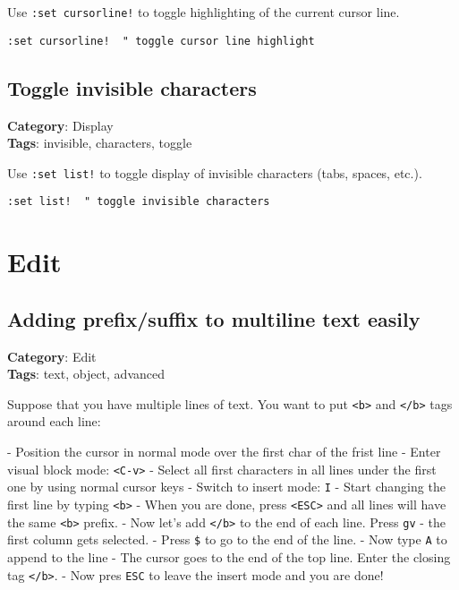{{{{Use {\footnotesize \Verb§:set cursorline!§} to toggle highlighting of the current cursor line.

\begin{Exa*}{}
\begin{Verbatim}[fontsize=\footnotesize, breaklines, breakanywhere]
:set cursorline!  " toggle cursor line highlight
\end{Verbatim}
\end{Exa*}

\section{Toggle invisible characters}

\textbf{Category}: Display\\ \textbf{Tags}: invisible, characters, toggle
\vspace{0.5cm}

Use {\footnotesize \Verb§:set list!§} to toggle display of invisible characters (tabs, spaces, etc.).

\begin{Exa*}{}
\begin{Verbatim}[fontsize=\footnotesize, breaklines, breakanywhere]
:set list!  " toggle invisible characters
\end{Verbatim}
\end{Exa*}

\chapter{Edit}
\section{Adding prefix/suffix to multiline text easily}

\textbf{Category}: Edit\\ \textbf{Tags}: text, object, advanced
\vspace{0.5cm}

Suppose that you have multiple lines of text. You want to put {\footnotesize \Verb§<b>§} and {\footnotesize \Verb§</b>§} tags around each line:

- Position the cursor in normal mode over the first char of the frist line
- Enter visual block mode: {\footnotesize \Verb§<C-v>§}
- Select all first characters in all lines under the first one by using normal cursor keys
- Switch to insert mode: {\footnotesize \Verb§I§}
- Start changing the first line by typing {\footnotesize \Verb§<b>§}
- When you are done, press {\footnotesize \Verb§<ESC>§} and all lines will have the same {\footnotesize \Verb§<b>§} prefix.
- Now let's add {\footnotesize \Verb§</b>§} to the end of each line. Press {\footnotesize \Verb§gv§} - the first column gets selected.
- Press {\footnotesize \Verb§$§} to go to the end of the line.
- Now type {\footnotesize \Verb§A§} to append to the line
- The cursor goes to the end of the top line. Enter the closing tag {\footnotesize \Verb§</b>§}.
- Now pres {\footnotesize \Verb§ESC§} to leave the insert mode and you are done!

}}}}
